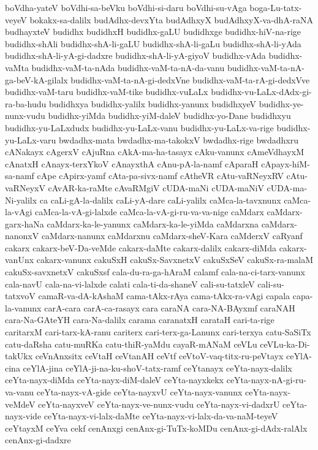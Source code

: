 {boVdha-yateV
boVdhi-sa-beVku
boVdhi-si-daru
boVdhi-su-vAga
boga-Lu-tatx-veyeV
bokakx-sa-dalilx
budAdhx-devxYta
budAdhxyX
budAdhxyX-va-dhA-raNA
budhayxteV
budidhx
budidhxH
budidhx-gaLU
budidhxge
budidhx-hiV-na-rige
budidhx-shAli
budidhx-shA-li-gaLU
budidhx-shA-li-gaLu
budidhx-shA-li-yAda
budidhx-shA-li-yA-gi-dadxre
budidhx-shA-li-yA-giyoV
budidhx-vAda
budidhx-vaMta
budidhx-vaM-ta-nAda
budidhx-vaM-ta-nA-da-vanu
budidhx-vaM-ta-nA-ga-beV-kA-gilalx
budidhx-vaM-ta-nA-gi-dedxVne
budidhx-vaM-ta-rA-gi-dedxVve
budidhx-vaM-taru
budidhx-vaM-tike
budidhx-vuLaLx
budidhx-vu-LaLx-dAdx-gi-ra-ba-hudu
budidhxya
budidhx-yalilx
budidhx-yanunx
budidhxyeV
budidhx-ye-nunx-vudu
budidhx-yiMda
budidhx-yiM-daleV
budidhx-yo-Dane
budidhxyu
budidhx-yu-LaLxdudx
budidhx-yu-LaLx-vanu
budidhx-yu-LaLx-va-rige
budidhx-yu-LaLx-varu
bwdadhx-mata
bwdadhx-ma-takokxV
bwdadhx-rige
bwdadhxru
cANakayx
cAgerxV
cAjuRna
cAkA-ma-ha-tasayx
cAku-vanunx
cAmeVdhayxM
cAnatxH
cAnayx-terxYkoV
cAnayxthA
cAnu-pA-la-namf
cAparaH
cApayx-hiM-sa-namf
cApe
cApirx-yamf
cAta-pa-sivx-namf
cAtheVR
cAtu-vaRNeyxRV
cAtu-vaRNeyxV
cAvAR-ka-raMte
cAvaRMgiV
cUDA-maNi
cUDA-maNiV
cUDA-ma-Ni-yalilx
ca
caLi-gA-la-dalilx
caLi-yA-dare
caLi-yalilx
caMca-la-tavxnunx
caMca-la-vAgi
caMca-la-vA-gi-lalxde
caMca-la-vA-gi-ru-va-va-nige
caMdarx
caMdarx-garx-haNa
caMdarx-ka-le-yanunx
caMdarx-ka-le-yiMda
caMdarxna
caMdarx-nanonxV
caMdarx-nanunx
caMdarxnu
caMdarx-sheV-Kara
caMderxV
caRyanf
cakarx
cakarx-beV-Da-veMde
cakarx-daMte
cakarx-dalilx
cakarx-diMda
cakarx-vanUnx
cakarx-vanunx
cakuSxH
cakuSx-SavxnetxV
cakuSxSeV
cakuSx-ra-malaM
cakuSx-savxnetxV
cakuSxsf
cala-du-ra-ga-hAraM
calamf
cala-na-ci-tarx-vanunx
cala-navU
cala-na-vi-lalxde
calati
cala-ti-da-shaneV
cali-su-tatxleV
cali-su-tatxvoV
camaR-va-dA-kAshaM
cama-tAkx-rAya
cama-tAkx-ra-vAgi
capala
capa-la-vanunx
carA-cara
carA-ca-rasayx
cara
caraNA
cara-NA-BAyxmf
caraNAH
cara-Na-GAteYH
cara-Na-dalilx
carama
caranatxH
carataH
cari-ta-rige
caritarxM
cari-tarx-kA-ranu
cariterx
cari-terx-ga-Lanunx
cari-terxya
catu-SaSiTx
catu-daRsha
catu-muRKa
catu-thiR-yaMdu
cayaR-mANaM
ceVLu
ceVLu-ka-Di-takUkx
ceVnAnxsitx
ceVtaH
ceVtanAH
ceVtf
ceVtoV-vaq-titx-ru-peVtayx
ceYlA-cina
ceYlA-jina
ceYlA-ji-na-ku-shoV-tatx-ramf
ceYtanayx
ceYta-nayx-dalilx
ceYta-nayx-diMda
ceYta-nayx-diM-daleV
ceYta-nayxkekx
ceYta-nayx-nA-gi-ru-va-vanu
ceYta-nayx-vA-gide
ceYta-nayxvU
ceYta-nayx-vanunx
ceYta-nayx-veMdeV
ceYta-nayxveV
ceYta-nayx-ve-nunx-vudu
ceYta-nayx-vi-dadxrU
ceYta-nayx-vide
ceYta-nayx-vi-lalx-daMte
ceYta-nayx-vi-lalx-da-va-naM-teyeV
ceYtayxM
ceYva
cekf
cenAnxgi
cenAnx-gi-TuTx-koMDu
cenAnx-gi-dAdx-ralAlx
cenAnx-gi-dadxre
}
